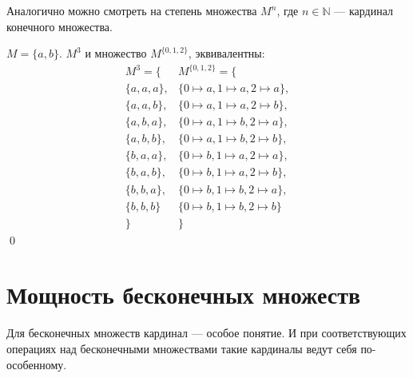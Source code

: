 Аналогично можно смотреть на степень множества $M^n$, где $n\in\mathbb{N}$ --- кардинал конечного множества.
\begin{exampl} $M=\{a,b\}$. $M^3$ и множество $M^{\{0,1,2\}}$, эквивалентны:
    \[
    \begin{array}{l||l}
        M^3 = \{    & M^{\{0,1,2\}}=\{              \\ \hline\hline
        \{a,a,a\},    & \{0\mapsto a, 1\mapsto a, 2\mapsto a\}, \\
        \{a,a,b\},    & \{0\mapsto a, 1\mapsto a, 2\mapsto b\}, \\
        \{a,b,a\},    & \{0\mapsto a, 1\mapsto b, 2\mapsto a\}, \\
        \{a,b,b\},    & \{0\mapsto a, 1\mapsto b, 2\mapsto b\}, \\
        \{b,a,a\},    & \{0\mapsto b, 1\mapsto a, 2\mapsto a\}, \\
        \{b,a,b\},    & \{0\mapsto b, 1\mapsto a, 2\mapsto b\}, \\
        \{b,b,a\},    & \{0\mapsto b, 1\mapsto b, 2\mapsto a\}, \\
        \{b,b,b\}     & \{0\mapsto b, 1\mapsto b, 2\mapsto b\}  \\ \hline\hline
        \}          &\}
    \end{array}
    \]
    \qed
\end{exampl}


\section{Мощность бесконечных множеств}

Для бесконечных множеств кардинал --- особое понятие. И при соответствующих операциях над бесконечными множествами такие кардиналы ведут себя по-особенному. 

